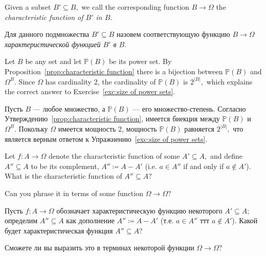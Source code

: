 \documentclass[../main/CT4S-EN-RU]{subfiles}
\begin{document}
\begin{definitionENG}
Given a subset $B'\subseteq B,$ we call the corresponding function $B{→}\Omega$ the {\em characteristic function of $B'$ in $B.$}
\end{definitionENG}

\begin{definitionRUS}
Для данного подмножества $B'\subseteq B$ назовем соответствующую функцию $B{→}\Omega$ {\em характеристической функцией $B'$ в $B.$}
\end{definitionRUS}

\begin{blockENG}
Let $B$ be any set and let ${ℙ}(B)$ be its power set. By Proposition~\ref{prop:characteristic function} there is a bijection between ${ℙ}(B)$ and $\Omega^B.$ Since $\Omega$ has cardinality 2, the cardinality of ${ℙ}(B)$ is $2^{|B|},$ which explains the correct answer to Exercise~\ref{exc:size of power sets}.
\end{blockENG}

\begin{blockRUS}
Пусть $B$ — любое множество, а ${ℙ}(B)$ — его множество-степень. Согласно Утверждению~\ref{prop:characteristic function}, имеется биекция между ${ℙ}(B)$ и $\Omega^B.$ Покольку $\Omega$ имеется мощность 2, мощность ${ℙ}(B)$ равняется $2^{|B|},$ что является верным ответом к Упражнению~\ref{exc:size of power sets}.
\end{blockRUS}

\begin{exerciseENG}
Let $f\colon A{→}\Omega$ denote the characteristic function of some $A'\subseteq A,$ and define $A''\subseteq A$ to be its complement, $A''{\coloneqq}A-A'$ (i.e. $a\in A''$ if and only if $a\not\in A'$). 
\sexc What is the characteristic function of $A''\subseteq A?$ 
\item Can you phrase it in terms of some function $\Omega{→}\Omega?$
\endsexc
\end{exerciseENG}

\begin{exerciseRUS}
Пусть $f\colon A{→}\Omega$ обозначает характеристическую функцию некоторого $A'\subseteq A$; определим $A''\subseteq A$ как дополнение $A''{\coloneqq}A-A'$ (т.е. $a\in A''$ ттт $a\not\in A'$). 
\sexc Какой будет характеристическая функция $A''\subseteq A?$ 
\item Сможете ли вы выразить это в терминах некоторой функции $\Omega{→}\Omega?$
\endsexc
\end{exerciseRUS}
\end{document}
